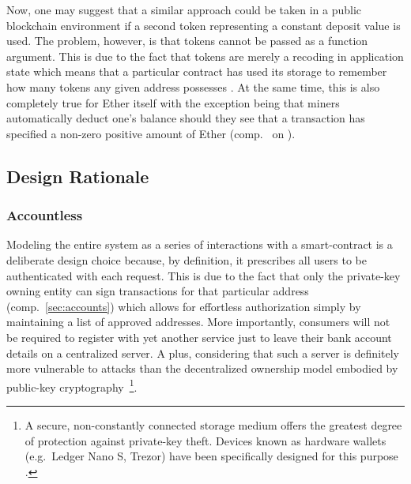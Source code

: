 \begin{description}
	Now, one may suggest that a similar approach could be taken in a public blockchain environment if a second token representing a constant deposit value is used. The problem, however, is that tokens cannot be passed as a function argument. This is due to the fact that tokens are merely a recoding in application state which means that a particular contract has used its storage to remember how many tokens any given address possesses \cite[pp.~181, 193]{Antonopoulos.2018}. At the same time, this is also completely true for Ether itself with the exception being that miners automatically deduct one's balance should they see that a transaction has specified a non-zero positive amount of Ether (comp.~ on ).
\end{description}

\subsection{Design Rationale}
\subsubsection{Accountless}
Modeling the entire system as a series of interactions with a smart-contract is a deliberate design choice because, by definition, it prescribes all users to be authenticated with each request. This is due to the fact that only the private-key owning entity can sign transactions for that particular address (comp.~\ref{sec:accounts}) which allows for effortless authorization simply by maintaining a list of approved addresses. More importantly, consumers will not be required to register with yet another service just to leave their bank account details on a centralized server. A plus, considering that such a server is definitely more vulnerable to attacks than the decentralized ownership model embodied by public-key cryptography~\footnote{A secure, non-constantly connected storage medium offers the greatest degree of protection against private-key theft. Devices known as hardware wallets (e.g.~Ledger Nano S, Trezor) have been specifically designed for this purpose \cite[p.~15]{nist2018}.}.

